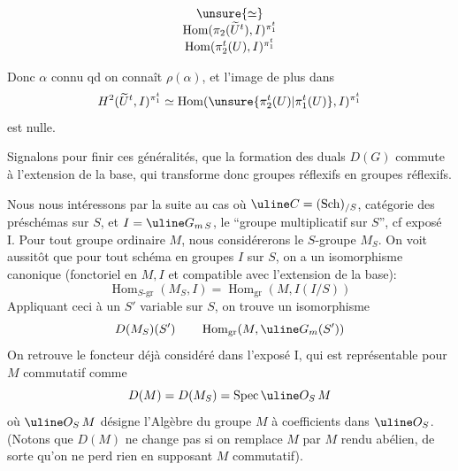 \[
\begin{array}{c}
\unsure{\simeq}\\
\operatorname{Hom}(\pi_2(\widetilde U^t),I)^{\pi_1^t}\\
\operatorname{Hom}(\pi_2^t(U),I)^{\pi_1^t}
\end{array}
\]

Donc $\alpha$ connu qd on connaît
$\rho(\alpha)$, et l'image de plus dans
\[
H^2(\widetilde U^t,I)^{\pi_1^t}
\simeq\operatorname{Hom}(\unsure{\pi_2^t(U)|\pi_1^t(U)},I)^{\pi_1^t}
\]
est nulle.

Signalons pour finir ces généralités, que la formation des duals
$D(G)$ commute à l'extension de la base, qui transforme donc groupes
réflexifs en groupes réflexifs.

Nous nous intéressons par la suite au cas où
$\uline C=(\mathrm{Sch})_{/S}$, catégorie
des préschémas sur $S$, et $I=\uline G_{m\,S}$,
le ``groupe multiplicatif sur $S$'',
cf exposé I. Pour tout groupe  ordinaire $M$, nous considérerons
le $S$-groupe $M_S$. On voit aussitôt que pour tout schéma en groupes
$I$ sur $S$, on a un isomorphisme canonique
(fonctoriel en $M,I$ et compatible avec l'extension de la base):
\[
\operatorname{Hom}_{S\text{-gr}}(M_S,I)
=\operatorname{Hom}_{\mathrm{gr}}(M,I(I/S))
\]
Appliquant ceci à un $S'$ variable sur $S$, on trouve un isomorphisme
\[
D(M_S)(S')\qquad\operatorname{Hom}_{\mathrm{gr}}(M,\uline G_m(S'))
\]
On retrouve le foncteur déjà considéré dans l'exposé I,
qui est représentable 
pour $M$ commutatif comme
\[
D(M)=D(M_S)=\operatorname{Spec}\uline O_S\,M
\]
où $\uline O_S\,M$ désigne l'Algèbre du groupe $M$ à coefficients dans
$\uline O_S$. (Notons
que $D(M)$ ne change pas si on remplace $M$ par $M$ rendu
abélien, de sorte 
qu'on ne perd rien en supposant $M$ commutatif).

